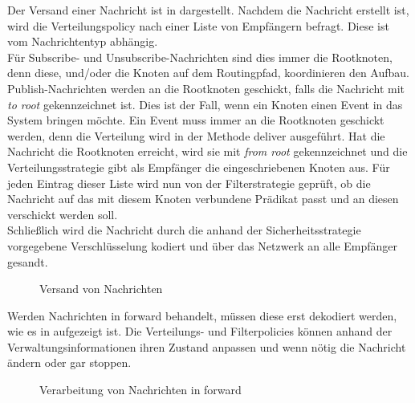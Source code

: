 Der Versand einer Nachricht ist in  dargestellt. Nachdem die Nachricht erstellt ist, wird die Verteilungspolicy nach einer Liste von Empfängern befragt. Diese ist vom Nachrichtentyp abhängig.\\
Für Subscribe- und Unsubscribe-Nachrichten sind dies immer die Rootknoten, denn diese, und/oder die Knoten auf dem Routingpfad, koordinieren den Aufbau.\\
Publish-Nachrichten werden an die Rootknoten geschickt, falls die Nachricht mit \emph{to root} gekennzeichnet ist. Dies ist der Fall, wenn ein Knoten einen Event in das System bringen möchte. Ein Event muss  immer an die Rootknoten geschickt werden, denn die Verteilung wird in der Methode deliver ausgeführt. Hat die Nachricht die Rootknoten erreicht, wird sie mit \emph{from root} gekennzeichnet und die Verteilungsstrategie gibt als Empfänger die eingeschriebenen Knoten aus. Für jeden Eintrag dieser Liste wird nun von der Filterstrategie geprüft, ob die Nachricht auf das mit diesem Knoten verbundene Prädikat passt und an diesen verschickt werden soll.\\
Schließlich wird die Nachricht durch die anhand der Sicherheitsstrategie vorgegebene Verschlüsselung kodiert und über das Netzwerk an alle Empfänger gesandt.

\begin{figure}[htbp]
\centering
{}
\caption{Versand von Nachrichten}
\label{fig:processing_send}
\end{figure}

Werden Nachrichten in forward behandelt, müssen diese erst dekodiert werden, wie es in  aufgezeigt ist. Die Verteilungs- und Filterpolicies können anhand der Verwaltungsinformationen ihren Zustand anpassen und wenn nötig die Nachricht ändern oder gar stoppen.

\begin{figure}[htbp]
\centering
{}
\caption{Verarbeitung von Nachrichten in forward}
\label{fig:processing_forward}
\end{figure}

